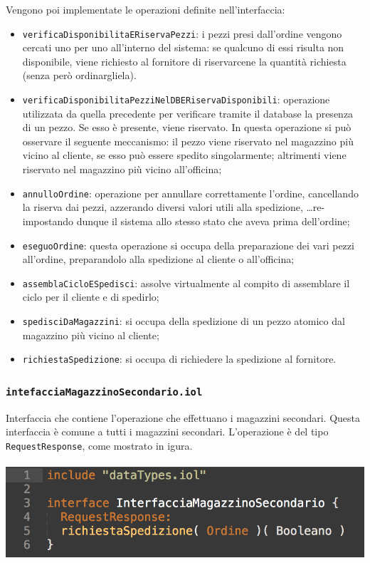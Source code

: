 Vengono poi implementate le operazioni definite nell'interfaccia:
\begin{itemize}
  \item {\tt verificaDisponibilitaERiservaPezzi}: i pezzi presi
  dall'ordine vengono cercati uno per uno all'interno del sistema: se
  qualcuno di essi risulta non disponibile, viene richiesto al fornitore
  di riservarcene la quantit\`a richiesta (senza per\`o ordinargliela).
  \item {\tt verificaDisponibilitaPezziNelDBERiservaDisponibili}:
  operazione utilizzata da quella precedente per verificare tramite il
  database la presenza di un pezzo. Se esso \`e presente, viene
  riservato. In questa operazione si pu\`o osservare il seguente
  meccanismo: il pezzo viene riservato nel magazzino pi\`u vicino al
  cliente, se esso pu\`o essere spedito singolarmente; altrimenti viene
  riservato nel magazzino pi\`u vicino all'officina;
  \item {\tt annulloOrdine}: operazione per annullare correttamente
  l'ordine, cancellando la riserva dai pezzi, azzerando diversi valori
  utili alla spedizione, \dots re-impostando dunque il sistema allo
  stesso stato che aveva prima dell'ordine;
  \item {\tt eseguoOrdine}: questa operazione si occupa della
  preparazione dei vari pezzi all'ordine, preparandolo alla spedizione
  al cliente o all'officina;
  \item {\tt assemblaCicloESpedisci}: assolve virtualmente al compito
  di assemblare il ciclo per il cliente e di spedirlo;
  \item {\tt spedisciDaMagazzini}: si occupa della spedizione di un
  pezzo atomico dal magazzino pi\`u vicino al cliente;
  \item {\tt richiestaSpedizione}: si occupa di richiedere la spedizione
  al fornitore.
\end{itemize}

\subsubsection*{\tt intefacciaMagazzinoSecondario.iol}
Interfaccia che contiene l'operazione che effettuano i magazzini
secondari. Questa interfaccia \`e comune a tutti i magazzini secondari.
L'operazione \`e del tipo {\tt RequestResponse}, come mostrato in
igura. \\\\
\includegraphics[scale=0.5]{immagini/interfMagazzinoSecondario.png}

